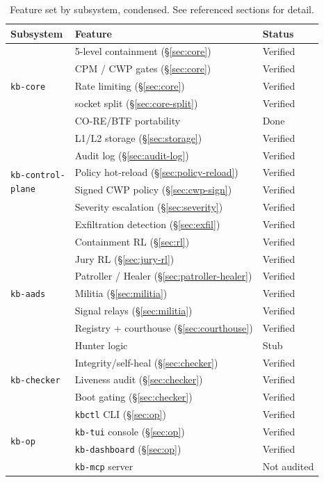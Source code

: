 \documentclass{article}
\begin{document}
\begin{table}[htbp]
\centering
\footnotesize
\caption{Feature set by subsystem, condensed. See referenced sections
for detail.}
\label{tab:features}
\begin{tabular}{@{}p{1.9cm}p{3.9cm}p{1.1cm}@{}}
\toprule
Subsystem & Feature & Status \\
\midrule
\multirow{5}{*}{\parbox{1.9cm}{\texttt{kb-core}}}
 & 5-level containment (\S\ref{sec:core}) & Verified \\
 & CPM / CWP gates (\S\ref{sec:core}) & Verified \\
 & Rate limiting (\S\ref{sec:core}) & Verified \\
 & socket split (\S\ref{sec:core-split}) & Verified \\
 & CO-RE/BTF portability & Done \\
\midrule
\multirow{6}{*}{\parbox{1.9cm}{\raggedright\texttt{kb-control-\\plane}}}
 & L1/L2 storage (\S\ref{sec:storage}) & Verified \\
 & Audit log (\S\ref{sec:audit-log}) & Verified \\
 & Policy hot-reload (\S\ref{sec:policy-reload}) & Verified \\
 & Signed CWP policy (\S\ref{sec:cwp-sign}) & Verified \\
 & Severity escalation (\S\ref{sec:severity}) & Verified \\
 & Exfiltration detection (\S\ref{sec:exfil}) & Verified \\
\midrule
\multirow{7}{*}{\parbox{1.9cm}{\texttt{kb-aads}}}
 & Containment RL (\S\ref{sec:rl}) & Verified \\
 & Jury RL (\S\ref{sec:jury-rl}) & Verified \\
 & Patroller / Healer (\S\ref{sec:patroller-healer}) & Verified \\
 & Militia (\S\ref{sec:militia}) & Verified \\
 & Signal relays (\S\ref{sec:militia}) & Verified \\
 & Registry + courthouse (\S\ref{sec:courthouse}) & Verified \\
 & Hunter logic & Stub \\
\midrule
\multirow{3}{*}{\parbox{1.9cm}{\texttt{kb-checker}}}
 & Integrity/self-heal (\S\ref{sec:checker}) & Verified \\
 & Liveness audit (\S\ref{sec:checker}) & Verified \\
 & Boot gating (\S\ref{sec:checker}) & Verified \\
\midrule
\multirow{4}{*}{\parbox{1.9cm}{\texttt{kb-op}}}
 & \texttt{kbctl} CLI (\S\ref{sec:op}) & Verified \\
 & \texttt{kb-tui} console (\S\ref{sec:op}) & Verified \\
 & \texttt{kb-dashboard} (\S\ref{sec:op}) & Verified \\
 & \texttt{kb-mcp} server & Not audited \\
\bottomrule
\end{tabular}
\end{table}
\end{document}
